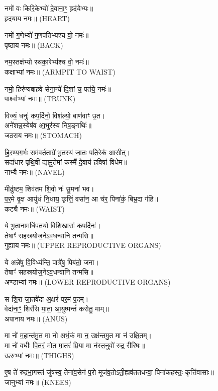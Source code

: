 नमो॑ वः किरि॒केभ्यो॑ दे॒वाना॒ꣳ॒ हृद॑येभ्यः॥\\
हृदयाय नमः॥ {\scriptsize (HEART)}

नमो॑ ग॒णेभ्यो॑ ग॒णप॑तिभ्यश्च वो॒ नमः॑॥\\
पृष्ठाय नमः॥ {\scriptsize (BACK)}

नम॒स्तक्ष॑भ्यो रथका॒रेभ्य॑श्च वो॒ नमः॑॥\\
कक्षाभ्यां नमः॥ {\scriptsize (ARMPIT TO WAIST)}

नमो॒ हिर॑ण्यबाहवे सेना॒न्ये॑ दि॒शां च॒ पत॑ये॒ नमः॑॥\\
पार्श्वाभ्यां नमः॥ {\scriptsize (TRUNK)}

 विज्यं॒ धनुः॑ कप॒र्दिनो॒ विश॑ल्यो॒ बाण॑वाꣳ उ॒त।\\
 अने॑शन्न॒स्येष॑व आ॒भुर॑स्य निष॒ङ्गथिः॑॥\\
जठराय नमः॥ {\scriptsize (STOMACH)}


हि॒र॒ण्य॒ग॒र्भः सम॑वर्त॒ताग्रे॑ भू॒तस्य॑ जा॒तः पति॒रेक॑ आसीत्।\\
सदा॑धार पृथि॒वीं द्यामु॒तेमां कस्मै॑ दे॒वाय॑ ह॒विषा॑ विधेम॥\\
नाभ्यै नमः॥ {\scriptsize (NAVEL)}

मीढु॑ष्टम॒ शिव॑तम शि॒वो नः॑ सु॒मना॑ भव।\\
 प॒र॒मे वृ॒क्ष आयु॑धं नि॒धाय॒ कृत्तिं॒ वसा॑न॒ आ च॑र॒ पिना॑कं॒ बिभ्र॒दा ग॑हि॥\\
कट्यै नमः॥ {\scriptsize (WAIST)}

 ये भू॒ताना॒मधि॑पतयो विशि॒खासः॑ कप॒र्दिनः॑। \\
तेषाꣳ॑ सहस्रयोज॒नेऽव॒धन्वा॑नि तन्मसि॥ \\
गुह्याय नमः॥ {\scriptsize (UPPER REPRODUCTIVE ORGANS)}

ये अन्ने॑षु वि॒विध्य॑न्ति॒ पात्रे॑षु॒ पिब॑तो॒ जना\sn{}।\\
तेषाꣳ॑ सहस्रयोज॒नेऽव॒धन्वा॑नि तन्मसि॥ \\
अण्डाभ्यां नमः॥ {\scriptsize (LOWER REPRODUCTIVE ORGANS)}

स शि॒रा जा॒तवे॑दा अ॒क्षरं॑ पर॒मं प॒दम्।\\
वेदा॑ना॒ꣳ॒ शिर॑सि मा॒ता॒ आ॒युष्मन्तं॑ करोतु॒ माम्॥\\
अपानाय नमः॥ {\scriptsize (ANUS)}

मा नो॑ म॒हान्त॑मु॒त मा नो॑ अर्भ॒कं मा न॒ उक्ष॑न्तमु॒त मा न॑ उक्षि॒तम्।\\
 मा नो॑ वधीः पि॒तरं॒ मोत मा॒तरं॑ प्रि॒या मा न॑स्त॒नुवो॑ रुद्र रीरिषः॥\\
ऊरुभ्यां नमः॥ {\scriptsize (THIGHS)}

ए॒ष ते॑ रुद्रभा॒गस्तं जु॑षस्व॒ तेना॑व॒सेन॑ प॒रो मूज॑व॒तोऽती॒\-ह्यव॑ततधन्वा॒ पिना॑कहस्तः॒ कृत्ति॑वासाः॥\\
जानुभ्यां नमः॥ {\scriptsize (KNEES)}

